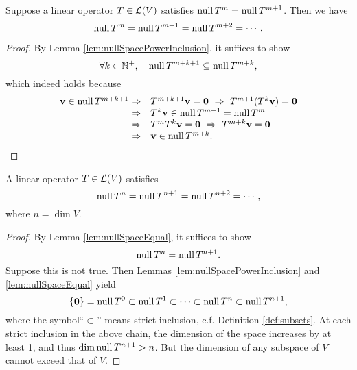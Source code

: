 \begin{lem}
  \label{lem:nullSpaceEqual}
  Suppose a linear operator $T\in {\cal L}(V)$ satisfies
  $\mathrm{null}\,T^m = \mathrm{null}\, T^{m+1}$. Then we have
  \begin{equation}
    \label{eq:nullSpaceEqual}
    \mathrm{null}\,T^m = \mathrm{null}\, T^{m+1} = \mathrm{null}\, T^{m+2}
    = \cdots .
  \end{equation}
\end{lem}
\begin{proof}
  By Lemma \ref{lem:nullSpacePowerInclusion},
  it suffices to show
  \begin{displaymath}
    \forall k\in \mathbb{N}^+,\quad
    \mathrm{null}\, T^{m+k+1}\subseteq \mathrm{null}\, T^{m+k}, 
  \end{displaymath}
  which indeed holds because
  \begin{displaymath}
    \begin{array}{rl}
      \mathbf{v}\in \Null\,T^{m+k+1} \Rightarrow
      & T^{m+k+1}\mathbf{v}=\mathbf{0}\ \Rightarrow\ 
        T^{m+1}(T^k\mathbf{v})=\mathbf{0}\\
      \Rightarrow &
                    T^k \mathbf{v}\in \Null\,T^{m+1}=\Null\,T^{m}
      \\
      \Rightarrow &
                    T^{m}T^k\mathbf{v}=\mathbf{0}\ \Rightarrow\ 
                    T^{m+k}\mathbf{v}=\mathbf{0}\\
      \Rightarrow &
      \mathbf{v}\in \Null\,T^{m+k}. \qedhere
    \end{array}
  \end{displaymath}
\end{proof}

\begin{lem}
  \label{lem:nullSpaceStopGrowing}
  A linear operator $T\in {\cal L}(V)$ satisfies
  \begin{equation}
    \label{eq:nullSpaceStopGrowing}
    \mathrm{null}\,T^n = \mathrm{null}\, T^{n+1} = \mathrm{null}\, T^{n+2}
    = \cdots ,
  \end{equation}
  where $n=\dim V$.
\end{lem}
\begin{proof}
  By Lemma \ref{lem:nullSpaceEqual}, it suffices to show
  \begin{displaymath}
    \mathrm{null}\,T^n = \mathrm{null}\, T^{n+1}.
  \end{displaymath}
  Suppose this is not true.
  Then Lemmas \ref{lem:nullSpacePowerInclusion}
  and \ref{lem:nullSpaceEqual} yield
  \begin{displaymath}
    \{\mathbf{0}\}=\mathrm{null}\,T^0 \subset \mathrm{null}\, T^{1}
    \subset \cdots \subset \mathrm{null}\, T^{n} \subset \mathrm{null}\, T^{n+1},
  \end{displaymath}
  where the symbol``$\subset$'' means strict inclusion,
  c.f. Definition \ref{def:subsets}.
  At each strict inclusion in the above chain,
  the dimension of the space increases by at least 1,
  and thus $\dim \mathrm{null}\, T^{n+1}> n$.
  But the dimension of any subspace of $V$
  cannot exceed that of $V$.
\end{proof}

